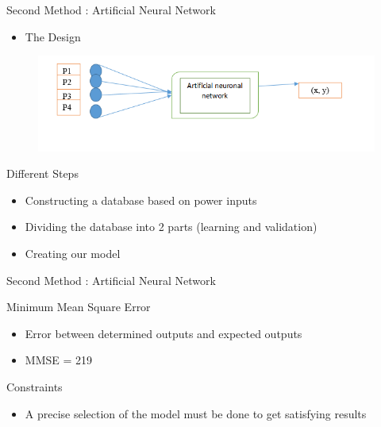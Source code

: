 \documentclass[utf8,compress]{beamer}
\begin{document}
\begin{frame}[containsverbatim]{Second Method : Artificial Neural Network}
\begin{itemize}
    \item The Design
      \end{itemize}
\begin{figure}[h]
    \center
    \includegraphics[width=\textwidth]{rn.png}
\end{figure}

\begin{block}{Different Steps }
\begin{itemize}
    \item Constructing a database based on power inputs
\vspace{0.4em} 
    \item  Dividing the database into 2 parts (learning and validation)
\vspace{0.4em} 
    \item  Creating our model 
      \end{itemize}
\end{block}
\end{frame}


\begin{frame}[containsverbatim]{Second Method : Artificial Neural Network}
\begin{block}{Minimum Mean Square Error}
\begin{itemize}
\vspace{0.8em} 
    \item Error between determined outputs and expected outputs
    \item  MMSE = 219
\vspace{0.8em} 
\end{itemize}
\end{block}

\begin{alertblock}{Constraints}
\begin{itemize}
    \item A precise selection of the model must be done to get satisfying results 
\end{itemize}
\end{alertblock}
\end{frame}
\end{document}
